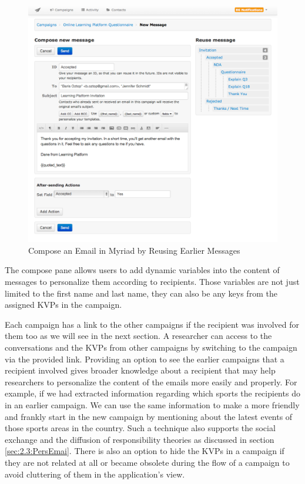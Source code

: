\begin{figure}[htbp]
	\centering
	\includegraphics[width=1.00\textwidth]{imgs/ComposeEmail.png}
	\caption[Compose an Email in Myriad by Reusing Earlier Messages]{Compose an Email in Myriad by Reusing Earlier Messages}
	\label{fig:ComposeEmail}
\end{figure}

The compose pane allows users to add dynamic variables into the content of messages to personalize them according to recipients. Those variables are not just limited to the first name and last name, they can also be any keys from the assigned \ac{KVP}s in the campaign.
\vspace{1cm}

\clearpage

Each campaign has a link to the other campaigns if the recipient was involved for them too as we will see in the next section. A researcher can access to the conversations and the \ac{KVP}s from other campaigns by switching to the campaign via the provided link. Providing an option to see the earlier campaigns that a recipient involved gives broader knowledge about a recipient that may help researchers to personalize the content of the emails more easily and properly. For example, if we had extracted information regarding which sports the recipients do in an earlier campaign. We can use the same information to make a more friendly and frankly start in the new campaign by mentioning about the latest events of those sports areas in the country. Such a technique also supports the social exchange and the diffusion of responsibility theories as discussed in section \ref{sec:2.3:PersEmai}. There is also an option to hide the \ac{KVP}s in a campaign if they are not related at all or became obsolete during the flow of a campaign to avoid cluttering of them in the application's view.
\vspace{1cm}

